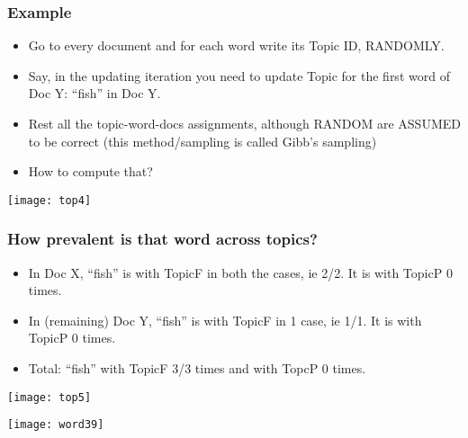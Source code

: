 \begin{frame}[fragile]\frametitle{Example}
  \begin{itemize}
	\item Go to every document and for each word write its Topic ID, RANDOMLY.
\item Say, in the updating iteration you need to update Topic for the first word of Doc Y: ``fish'' in Doc Y.
\item Rest all the topic-word-docs assignments, although RANDOM are ASSUMED to be correct (this method/sampling is called Gibb's sampling)
\item How to compute that?
  \end{itemize}
	
\begin{center}
\texttt{[image: top4]}
\end{center}

\end{frame}



\begin{frame}[fragile]\frametitle{How prevalent is that word across topics? }
  \begin{itemize}
	\item In Doc X, ``fish'' is with TopicF in both the cases, ie 2/2. It is with TopicP 0 times.
	\item In (remaining) Doc Y, ``fish'' is with TopicF in 1 case, ie 1/1. It is with TopicP 0 times.
	\item Total: ``fish'' with TopicF 3/3 times and with TopcP 0 times.
  \end{itemize}
  
\begin{center}
\texttt{[image: top5]}

\texttt{[image: word39]}
\end{center}
\end{frame}




